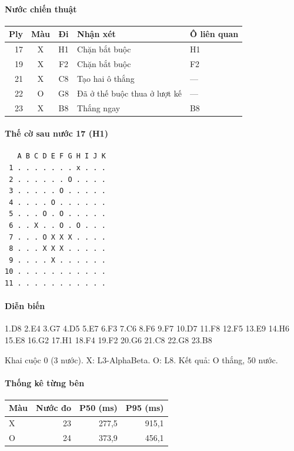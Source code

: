 \paragraph{Nước chiến thuật}
\begin{center}\small
\begin{tabular}{@{}rccll@{}}
\toprule
Ply & Màu & Đi & Nhận xét & Ô liên quan \\
\midrule
17 & X & H1 & Chặn bắt buộc & H1 \\
19 & X & F2 & Chặn bắt buộc & F2 \\
21 & X & C8 & Tạo hai ô thắng & — \\
22 & O & G8 & Đã ở thế buộc thua ở lượt kế & — \\
23 & X & B8 & Thắng ngay & B8 \\
\bottomrule
\end{tabular}
\end{center}
\paragraph{Thế cờ sau nước 17 (H1)}
\begin{verbatim}
   A B C D E F G H I J K
 1 . . . . . . . x . . .
 2 . . . . . . O . . . .
 3 . . . . . O . . . . .
 4 . . . . O . . . . . .
 5 . . . O . O . . . . .
 6 . . X . . O . O . . .
 7 . . . O X X X . . . .
 8 . . . X X X . . . . .
 9 . . . . X . . . . . .
10 . . . . . . . . . . .
11 . . . . . . . . . . .
\end{verbatim}
\paragraph{Diễn biến}
{\footnotesize 1.D8 2.E4 3.G7 4.D5 5.E7 6.F3 7.C6 8.F6 9.F7 10.D7 11.F8 12.F5 13.E9 14.H6 15.E8 16.G2 17.H1 18.F4 19.F2 20.G6 21.C8 22.G8 23.B8\par}
Khai cuộc 0 (3 nước). X: L3-AlphaBeta. O: L8. Kết quả: O thắng, 50 nước.
\paragraph{Thống kê từng bên}
\begin{center}\small
\begin{tabular}{@{}lrrr@{}}
\toprule
Màu & Nước đo & P50 (ms) & P95 (ms) \\
\midrule
X & 23 & 277,5 & 915,1 \\
O & 24 & 373,9 & 456,1 \\
\bottomrule
\end{tabular}
\end{center}
